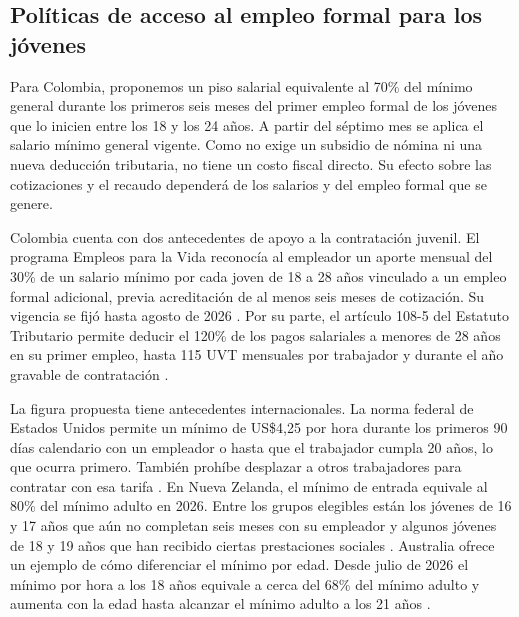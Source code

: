 \subsection{Políticas de acceso al empleo formal para los jóvenes}

Para Colombia, proponemos un piso salarial equivalente al 70\% del mínimo general durante los primeros seis meses del primer empleo formal de los jóvenes que lo inicien entre los 18 y los 24 años. A partir del séptimo mes se aplica el salario mínimo general vigente. %
Como no exige un subsidio de nómina ni una nueva deducción tributaria, no tiene un costo fiscal directo. Su efecto sobre las cotizaciones y el recaudo dependerá de los salarios y del empleo formal que se genere.



Colombia cuenta con dos antecedentes de apoyo a la contratación juvenil. El programa Empleos para la Vida reconocía al empleador un aporte mensual del 30\% de un salario mínimo por cada joven de 18 a 28 años vinculado a un empleo formal adicional, previa acreditación de al menos seis meses de cotización. Su vigencia se fijó hasta agosto de 2026 \citep{decreto5332024}. Por su parte, el artículo 108-5 del Estatuto Tributario permite deducir el 120\% de los pagos salariales a menores de 28 años en su primer empleo, hasta 115 UVT mensuales por trabajador y durante el año gravable de contratación \citep{dianPrimerEmpleo2026}.


La figura propuesta tiene antecedentes internacionales. La norma federal de Estados Unidos permite un mínimo de US\$4,25 por hora durante los primeros 90 días calendario con un empleador o hasta que el trabajador cumpla 20 años, lo que ocurra primero. También prohíbe desplazar a otros trabajadores para contratar con esa tarifa \citep{eeuuJuvenil}. En Nueva Zelanda, el mínimo de entrada equivale al 80\% del mínimo adulto en 2026. Entre los grupos elegibles están los jóvenes de 16 y 17 años que aún no completan seis meses con su empleador y algunos jóvenes de 18 y 19 años que han recibido ciertas prestaciones sociales \citep{nuevaZelandaJuvenil}. Australia ofrece un ejemplo de cómo diferenciar el mínimo por edad. Desde julio de 2026 el mínimo por hora a los 18 años equivale a cerca del 68\% del mínimo adulto y aumenta con la edad hasta alcanzar el mínimo adulto a los 21 años \citep{australiaJuvenil}.


